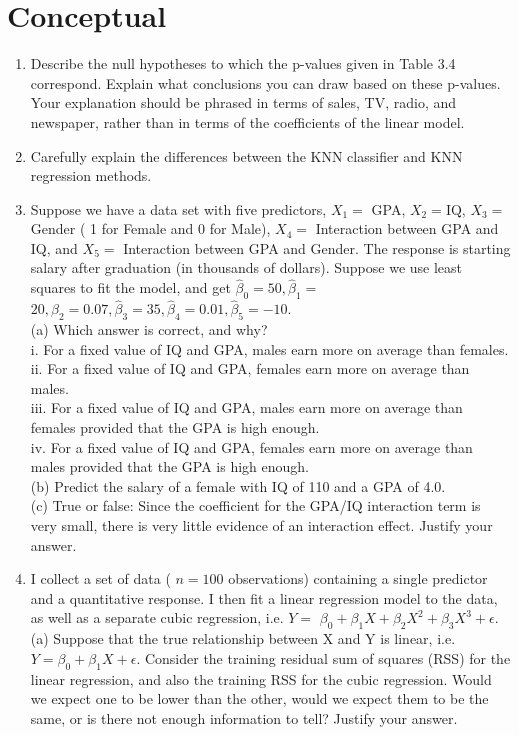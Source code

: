 \documentclass[10pt]{article}
\begin{document}
\section*{Conceptual}
\begin{enumerate}
  \item Describe the null hypotheses to which the p-values given in Table 3.4 correspond. Explain what conclusions you can draw based on these p-values. Your explanation should be phrased in terms of sales, TV, radio, and newspaper, rather than in terms of the coefficients of the linear model.
  \item Carefully explain the differences between the KNN classifier and KNN regression methods.
  \item Suppose we have a data set with five predictors, $X_{1}=$ GPA, $X_{2}=\mathrm{IQ}$, $X_{3}=$ Gender ( 1 for Female and 0 for Male), $X_{4}=$ Interaction between GPA and IQ, and $X_{5}=$ Interaction between GPA and Gender. The response is starting salary after graduation (in thousands of dollars). Suppose we use least squares to fit the model, and get $\hat{\beta}_{0}=50, \hat{\beta}_{1}=$ $20, \hat{\beta}_{2}=0.07, \hat{\beta}_{3}=35, \hat{\beta}_{4}=0.01, \hat{\beta}_{5}=-10$.\\
(a) Which answer is correct, and why?\\
i. For a fixed value of IQ and GPA, males earn more on average than females.\\
ii. For a fixed value of IQ and GPA, females earn more on average than males.\\
iii. For a fixed value of IQ and GPA, males earn more on average than females provided that the GPA is high enough.\\
iv. For a fixed value of IQ and GPA, females earn more on average than males provided that the GPA is high enough.\\
(b) Predict the salary of a female with IQ of 110 and a GPA of 4.0.\\
(c) True or false: Since the coefficient for the GPA/IQ interaction term is very small, there is very little evidence of an interaction effect. Justify your answer.
  \item I collect a set of data ( $n=100$ observations) containing a single predictor and a quantitative response. I then fit a linear regression model to the data, as well as a separate cubic regression, i.e. $Y=$ $\beta_{0}+\beta_{1} X+\beta_{2} X^{2}+\beta_{3} X^{3}+\epsilon$.\\
(a) Suppose that the true relationship between X and Y is linear, i.e. $Y=\beta_{0}+\beta_{1} X+\epsilon$. Consider the training residual sum of squares (RSS) for the linear regression, and also the training RSS for the cubic regression. Would we expect one to be lower than the other, would we expect them to be the same, or is there not enough information to tell? Justify your answer.\\

\end{enumerate}
\end{document}
